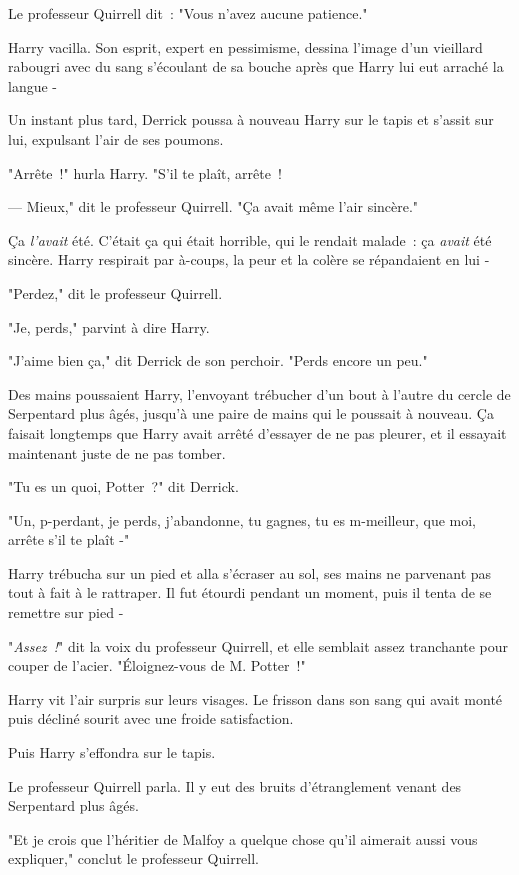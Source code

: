 Le professeur Quirrell dit~: "Vous n'avez aucune patience."

Harry vacilla. Son esprit, expert en pessimisme, dessina l'image d'un vieillard rabougri avec du sang s'écoulant de sa bouche après que Harry lui eut arraché la langue -

Un instant plus tard, Derrick poussa à nouveau Harry sur le tapis et s'assit sur lui, expulsant l'air de ses poumons.

"Arrête~!" hurla Harry. "S'il te plaît, arrête~!

--- Mieux," dit le professeur Quirrell. "Ça avait même l'air sincère."

Ça \emph{l'avait} été. C'était ça qui était horrible, qui le rendait malade~: ça \emph{avait} été sincère. Harry respirait par à-coups, la peur et la colère se répandaient en lui -

"Perdez," dit le professeur Quirrell.

"Je, perds," parvint à dire Harry.

"J'aime bien ça," dit Derrick de son perchoir. "Perds encore un peu."

\later

Des mains poussaient Harry, l'envoyant trébucher d'un bout à l'autre du cercle de Serpentard plus âgés, jusqu'à une paire de mains qui le poussait à nouveau. Ça faisait longtemps que Harry avait arrêté d'essayer de ne pas pleurer, et il essayait maintenant juste de ne pas tomber.

"Tu es un quoi, Potter~?" dit Derrick.

"Un, p-perdant, je perds, j'abandonne, tu gagnes, tu es m-meilleur, que moi, arrête s'il te plaît -"

Harry trébucha sur un pied et alla s'écraser au sol, ses mains ne parvenant pas tout à fait à le rattraper. Il fut étourdi pendant un moment, puis il tenta de se remettre sur pied -

"\emph{Assez~!}" dit la voix du professeur Quirrell, et elle semblait assez tranchante pour couper de l'acier. "Éloignez-vous de M. Potter~!"

Harry vit l'air surpris sur leurs visages. Le frisson dans son sang qui avait monté puis décliné sourit avec une froide satisfaction.

Puis Harry s'effondra sur le tapis.

Le professeur Quirrell parla. Il y eut des bruits d'étranglement venant des Serpentard plus âgés.

"Et je crois que l'héritier de Malfoy a quelque chose qu'il aimerait aussi vous expliquer," conclut le professeur Quirrell.

